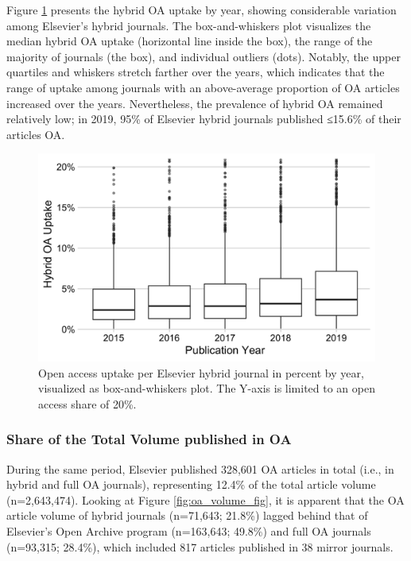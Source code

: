\documentclass[a4paper,man,floatsintext,longtable,noextraspace,12pt]{apa6}
\begin{document}
Figure \ref{fig:boxuptake} presents the hybrid OA uptake by year,
showing considerable variation among Elsevier's hybrid journals. The
box-and-whiskers plot visualizes the median hybrid OA uptake (horizontal
line inside the box), the range of the majority of journals (the box),
and individual outliers (dots). Notably, the upper quartiles and
whiskers stretch farther over the years, which indicates that the range
of uptake among journals with an above-average proportion of OA articles
increased over the years. Nevertheless, the prevalence of hybrid OA
remained relatively low; in 2019, 95\% of Elsevier hybrid journals
published ≤15.6\% of their articles OA.

\begin{figure}[H]

{\centering \includegraphics[width=0.7\linewidth,]{manuscript_files/figure-latex/boxuptake-1} 

}

\caption{Open access uptake per Elsevier hybrid journal in percent by year, visualized as box-and-whiskers plot. The Y-axis is limited to an open access share of 20\%.}\label{fig:boxuptake}
\end{figure}

\hypertarget{share-of-the-total-volume-published-in-oa}{%
\subsubsection*{Share of the Total Volume published in
OA}\label{share-of-the-total-volume-published-in-oa}}

During the same period, Elsevier published 328,601 OA articles in total
(i.e., in hybrid and full OA journals), representing 12.4\% of the total
article volume (n=2,643,474). Looking at Figure \ref{fig:oa_volume_fig},
it is apparent that the OA article volume of hybrid journals (n=71,643;
21.8\%) lagged behind that of Elsevier's Open Archive program
(n=163,643; 49.8\%) and full OA journals (n=93,315; 28.4\%), which
included 817 articles published in 38 mirror journals.
\end{document}
